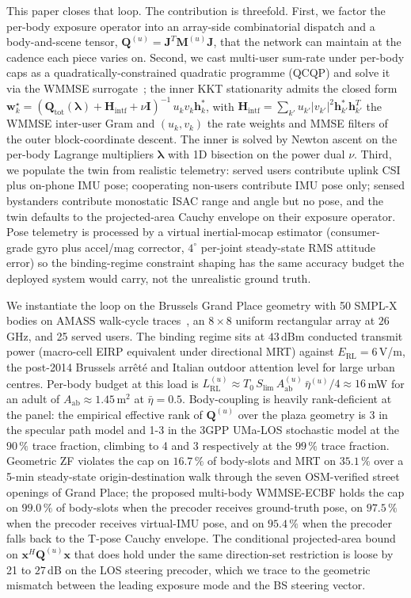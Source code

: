 \documentclass[journal,twocolumn,10pt]{IEEEtran}
\theoremstyle{plain}
\theoremstyle{remark}
\newcommand{\xx}{\mathbf{x}}
\newcommand{\hh}{\mathbf{h}}
\newcommand{\ww}{\mathbf{w}}
\newcommand{\Aab}{A_{\mathrm{ab}}}
\newcommand{\Qmat}{\mathbf{Q}}
\newcommand{\Mmat}{\mathbf{M}}
\newcommand{\Hintf}{\mathbf{H}_{\mathrm{intf}}}
\newcommand{\Jmat}{\mathbf{J}}
\begin{document}
This paper closes that loop. The contribution is threefold. First,
we factor the per-body exposure operator into an array-side
combinatorial dispatch and a body-and-scene tensor,
$\Qmat^{(u)} = \Jmat^T \Mmat^{(u)} \Jmat$, that the network can
maintain at the cadence each piece varies on. Second, we cast
multi-user sum-rate under per-body caps as a quadratically-constrained
quadratic programme (QCQP) and solve it via the WMMSE
surrogate~\cite{Christensen2008,Shi2011}; the inner KKT stationarity
admits the closed form
$\ww_k^\star = (\Qmat_{\mathrm{tot}}(\bm\lambda)
+ \Hintf + \nu\mathbf{I})^{-1}\,u_k v_k \hh_k^*$, with
$\Hintf = \sum_{k'} u_{k'} |v_{k'}|^2 \hh_{k'}^* \hh_{k'}^T$ the
WMMSE inter-user Gram and $(u_k, v_k)$ the rate weights and MMSE
filters of the outer block-coordinate descent. The inner is solved by
Newton ascent on the per-body Lagrange multipliers $\bm\lambda$ with
1D bisection on the power dual $\nu$. Third, we populate the twin
from realistic telemetry: served users contribute uplink CSI plus
on-phone IMU pose; cooperating non-users contribute IMU pose only;
sensed bystanders contribute monostatic ISAC range and angle but no
pose, and the twin defaults to the projected-area Cauchy envelope on
their exposure operator. Pose telemetry is processed by a virtual
inertial-mocap estimator (consumer-grade gyro plus accel/mag
corrector, $4^\circ$ per-joint steady-state RMS attitude error) so
the binding-regime constraint shaping has the same accuracy budget
the deployed system would carry, not the unrealistic ground truth.

We instantiate the loop on the Brussels Grand Place geometry with
50 SMPL-X bodies on AMASS walk-cycle traces~\cite{SMPL,SMPLX,AMASS},
an $8\times 8$ uniform rectangular array at $26\,$GHz, and 25 served
users. The binding regime sits at $43\,$dBm conducted transmit power
(macro-cell EIRP equivalent under directional MRT) against
$E_{\mathrm{RL}} = 6\,$V/m, the post-2014 Brussels arr\^et\'e and
Italian outdoor attention level for large urban centres. Per-body
budget at this load is $L^{(u)}_{\mathrm{RL}} \approx
T_0\,S_{\mathrm{lim}}\,\Aab^{(u)}\,\bar\eta^{(u)}/4 \approx
16\,$mW for an adult of $\Aab \approx 1.45\,$m$^2$ at
$\bar\eta = 0.5$. Body-coupling is heavily rank-deficient at the
panel: the empirical effective rank of $\Qmat^{(u)}$ over the
plaza geometry is 3 in the specular path model and 1-3 in the
3GPP UMa-LOS stochastic model at the $90\,\%$ trace fraction,
climbing to 4 and 3 respectively at the $99\,\%$ trace fraction.
Geometric ZF violates the cap on $16.7\,\%$ of body-slots and MRT
on $35.1\,\%$ over a 5-min steady-state origin-destination walk
through the seven OSM-verified street openings of Grand Place; the
proposed multi-body WMMSE-ECBF holds the cap on $99.0\,\%$ of
body-slots when the precoder receives ground-truth pose, on
$97.5\,\%$ when the precoder receives virtual-IMU pose, and on
$95.4\,\%$ when the precoder falls back to the T-pose Cauchy envelope.
The conditional projected-area bound on $\xx^H \Qmat^{(u)} \xx$
that does hold under the same direction-set restriction is loose by
21 to $27\,$dB on the LOS steering precoder, which we trace to the
geometric mismatch between the leading exposure mode and the BS
steering vector.
\end{document}
